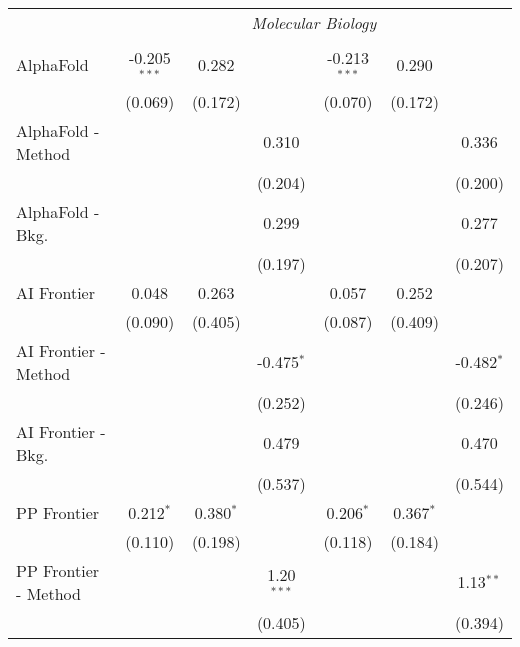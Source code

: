 \begin{tabular}{lcccccc}
 & \multicolumn{6}{c}{\textit{Molecular Biology}} \\ \\
   AlphaFold            & -0.205$^{***}$ & 0.282         &               & -0.213$^{***}$ & 0.290         &   \\   
                        & (0.069)        & (0.172)       &               & (0.070)        & (0.172)       &   \\   
   AlphaFold - Method   &                &               & 0.310         &                &               & 0.336\\   
                        &                &               & (0.204)       &                &               & (0.200)\\   
   AlphaFold - Bkg.     &                &               & 0.299         &                &               & 0.277\\   
                        &                &               & (0.197)       &                &               & (0.207)\\   
   AI Frontier          & 0.048          & 0.263         &               & 0.057          & 0.252         &   \\   
                        & (0.090)        & (0.405)       &               & (0.087)        & (0.409)       &   \\   
   AI Frontier - Method &                &               & -0.475$^{*}$  &                &               & -0.482$^{*}$\\   
                        &                &               & (0.252)       &                &               & (0.246)\\   
   AI Frontier - Bkg.   &                &               & 0.479         &                &               & 0.470\\   
                        &                &               & (0.537)       &                &               & (0.544)\\   
   PP Frontier          & 0.212$^{*}$    & 0.380$^{*}$   &               & 0.206$^{*}$    & 0.367$^{*}$   &   \\   
                        & (0.110)        & (0.198)       &               & (0.118)        & (0.184)       &   \\   
   PP Frontier - Method &                &               & 1.20$^{***}$  &                &               & 1.13$^{**}$\\   
                        &                &               & (0.405)       &                &               & (0.394)\\   

\end{tabular}
